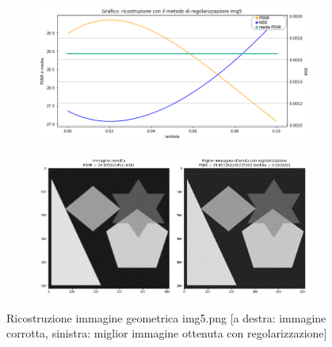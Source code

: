 \begin{figure}[H]
    \begin{subfigure}{0.5\textwidth}
        \includegraphics[width=\textwidth]{imgRicostruzione/grafico5minimize.png}
    \end{subfigure}%
    \begin{subfigure}{0.5\textwidth}
        \centering
        \includegraphics[width=\textwidth]{imgRicostruzione/ricostruzione5minimize.png}
    \end{subfigure}
    \caption{Ricostruzione immagine geometrica img5.png [a destra: immagine corrotta, sinistra: miglior immagine ottenuta con regolarizzazione]}
    

\end{figure}
